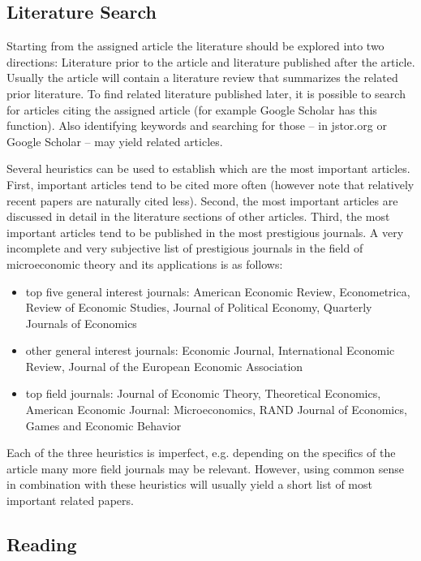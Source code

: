 \documentclass[a4paper,11pt]{article}
\begin{document}
\subsection{Literature Search}
\label{sec:literature-search}
Starting from the assigned article the literature should be explored into two directions: Literature prior to the article and literature published after the article. Usually the article will contain a literature review that summarizes the related prior literature. To find related literature published later, it is possible to search for articles citing the assigned article (for example Google Scholar has this function). Also identifying keywords and searching for those -- in jstor.org or Google Scholar -- may yield related articles.

Several heuristics can be used to establish which are the most important articles. First, important articles tend to be cited more often (however note that relatively recent papers are naturally cited less). Second, the most important articles are discussed in detail in the literature sections of other articles. Third, the most important articles tend to be published in the most prestigious journals. A very incomplete and very subjective list of prestigious journals in the field of microeconomic theory and its applications is as follows:

\begin{itemize}
\item top five general interest journals: American Economic Review, Econometrica, Review of Economic Studies, Journal of Political Economy, Quarterly Journals of Economics
\item other general interest journals: Economic Journal, International Economic Review, Journal of the European Economic Association
\item top field journals: Journal of Economic Theory, Theoretical Economics, American Economic Journal: Microeconomics, RAND Journal of Economics, Games and Economic Behavior
\end{itemize}
Each of the three heuristics is imperfect, e.g. depending on the specifics of the  article many more field journals may be relevant. However, using common sense in combination with these heuristics will usually yield a short list of most important related papers.

\subsection{Reading}
\label{sec:reading}
\end{document}
